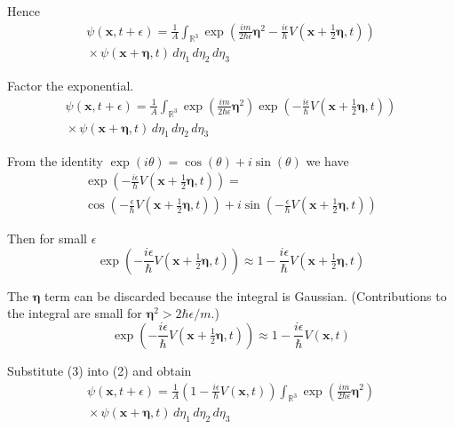 \documentclass[12pt]{article}
\begin{document}
Hence
\begin{multline*}
\psi(\mathbf{x},t+\epsilon)=
\frac{1}{A}\int_{\mathbb R^3}
\exp\left(
\frac{im}{2\hbar\epsilon}\boldsymbol\eta^2
-\frac{i\epsilon}{\hbar} V\left(\mathbf x+\tfrac{1}{2}\boldsymbol\eta,t\right)
\right)
\\
{}\times\psi(\mathbf{x}+\boldsymbol\eta,t)\,d\eta_1\,d\eta_2\,d\eta_3
\end{multline*}

Factor the exponential.
\begin{multline*}
\psi(\mathbf{x},t+\epsilon)=
\frac{1}{A}\int_{\mathbb R^3}
\exp\left(\frac{im}{2\hbar\epsilon}\boldsymbol\eta^2\right)
\exp\left(-\frac{i\epsilon}{\hbar}V\left(\mathbf x+\tfrac{1}{2}\boldsymbol\eta,t\right)\right)
\\
{}\times\psi(\mathbf{x}+\boldsymbol\eta,t)\,d\eta_1\,d\eta_2\,d\eta_3
\tag{2}
\end{multline*}

From the identity $\exp(i\theta)=\cos(\theta)+i\sin(\theta)$ we have
\begin{multline*}
\exp\left(-\frac{i\epsilon}{\hbar}V\left(\mathbf x+\tfrac{1}{2}\boldsymbol\eta,t\right)\right)=
\\
\cos\left(-\frac{\epsilon}{\hbar}V\left(\mathbf x+\tfrac{1}{2}\boldsymbol\eta,t\right)\right)
+i\sin\left(-\frac{\epsilon}{\hbar}V\left(\mathbf x+\tfrac{1}{2}\boldsymbol\eta,t\right)\right)
\end{multline*}

Then for small $\epsilon$
\begin{equation*}
\exp\left(-\frac{i\epsilon}{\hbar}V\left(\mathbf x+\tfrac{1}{2}\boldsymbol\eta,t\right)\right)\approx
1-\frac{i\epsilon}{\hbar}V\left(\mathbf x+\tfrac{1}{2}\boldsymbol\eta,t\right)
\end{equation*}

The $\boldsymbol\eta$ term can be discarded because the integral is Gaussian.
(Contributions to the integral are small for $\boldsymbol\eta^2>2\hbar\epsilon/m$.)
\begin{equation*}
\exp\left(-\frac{i\epsilon}{\hbar}V\left(\mathbf x+\tfrac{1}{2}\boldsymbol\eta,t\right)\right)\approx
1-\frac{i\epsilon}{\hbar}V\left(\mathbf x,t\right)
\tag{3}
\end{equation*}

Substitute (3) into (2) and obtain
\begin{multline*}
\psi(\mathbf{x},t+\epsilon)=
\frac{1}{A}
\left(1-\frac{i\epsilon}{\hbar}V\left(\mathbf x,t\right)\right)
\int_{\mathbb R^3}
\exp\left(\frac{im}{2\hbar\epsilon}\boldsymbol\eta^2\right)
\\
{}\times\psi(\mathbf x+\boldsymbol\eta,t)\,d\eta_1\,d\eta_2\,d\eta_3
\tag{4}
\end{multline*}
\end{document}
